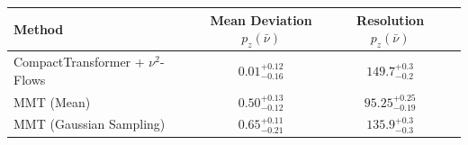    \begin{tabular}{lccc}
        \toprule
        Method & Mean Deviation $p_{z}(\bar{\nu})$ & Resolution $p_{z}(\bar{\nu})$ \\
        \midrule
        CompactTransformer + $\nu^2$-Flows & $0.01^{+0.12}_{-0.16}$ & $149.7^{+0.3}_{-0.2}$ \\
        MMT (Mean) & $0.50^{+0.13}_{-0.12}$ & $95.25^{+0.25}_{-0.19}$ \\
        MMT (Gaussian Sampling) & $0.65^{+0.11}_{-0.21}$ & $135.9^{+0.3}_{-0.3}$ \\
        \bottomrule
    \end{tabular}